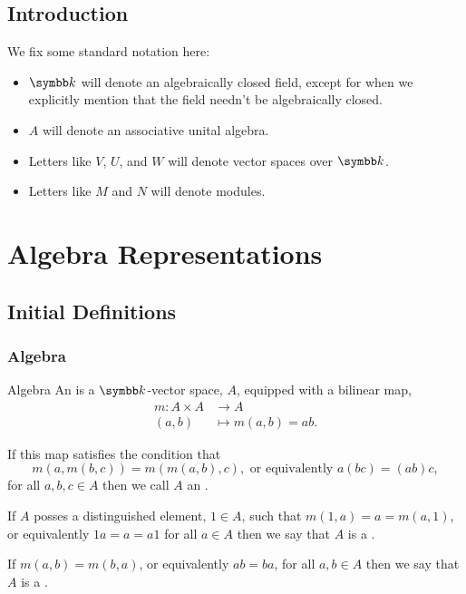 \chapter{Introduction}
We fix some standard notation here:
\begin{itemize}
    \item \(\field\) will denote an algebraically closed field, except for when we explicitly mention that the field needn't be algebraically closed.
    \item \(A\) will denote an associative unital algebra.
    \item Letters like \(V\), \(U\), and \(W\) will denote vector spaces over \(\field\).
    \item Letters like \(M\) and \(N\) will denote modules.
\end{itemize}

\part{Algebra Representations}
\chapter{Initial Definitions}
\section{Algebra}
\begin{dfn}{Algebra}{}
    An  is a \(\field\)-vector space, \(A\), equipped with a bilinear map,
    \begin{align}
        m \colon A \times A &\to A\\
        (a, b) &\mapsto m(a, b) = ab.
    \end{align}
    
    If this map satisfies the condition that
    \begin{equation}
        m(a, m(b, c)) = m(m(a, b), c), \text{ or equivalently } a(bc) = (ab)c,
    \end{equation}
    for all \(a, b, c \in A\) then we call \(A\) an .
    
    If \(A\) posses a distinguished element, \(1 \in A\), such that \(m(1, a) = a = m(a, 1)\), or equivalently \(1a = a = a1\) for all \(a \in A\) then we say that \(A\) is a .
    
    If \(m(a, b) = m(b, a)\), or equivalently \(ab = ba\), for all \(a, b \in A\) then we say that \(A\) is a .
\end{dfn}

